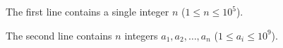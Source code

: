 The first line contains a single integer $n$ ($1 \le n \le 10^5$).

The second line contains $n$ integers $a_1, a_2, \ldots, a_n$ ($1 \le a_i \le 10^9$).
